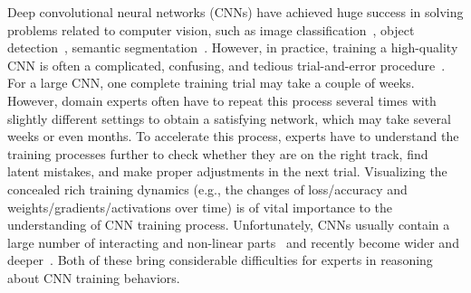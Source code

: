 \documentclass[format=acmsmall, review=false, screen=true]{acmart}
\newcommand{\ti}{\textcolor[rgb]{0,0,0}}
\begin{document}
Deep convolutional neural networks (CNNs) have achieved huge success in solving problems related to computer vision, such as image classification~\cite{krizhevsky2012imagenet, simonyan2014very}, object detection~\cite{girshick2014rich}, semantic segmentation~\cite{long2015fully}.
However, in practice, training a high-quality CNN is often a complicated, confusing, and tedious trial-and-error procedure~\cite{bengio2012practical}.
For a large CNN, one complete training trial may take a couple of weeks.
However, domain experts often have to repeat this process several times with slightly different settings to obtain a satisfying network, which may take several weeks or even months.
To accelerate this process, experts have to understand the training processes further to check whether they are on the right track, find latent mistakes, and make proper adjustments in the next trial.
Visualizing the concealed rich training dynamics (e.g., the changes of loss/accuracy and weights/gradients/activations over time) is of vital importance to the understanding of CNN training process.
Unfortunately, CNNs usually contain a large number of interacting and non-linear parts~\cite{bengio2013representation} and recently become wider and deeper~\cite{simonyan2014very, szegedy2015going, he2016deep, szegedy2016inception}. Both of these bring considerable difficulties for experts in reasoning about CNN training behaviors.
\end{document}
